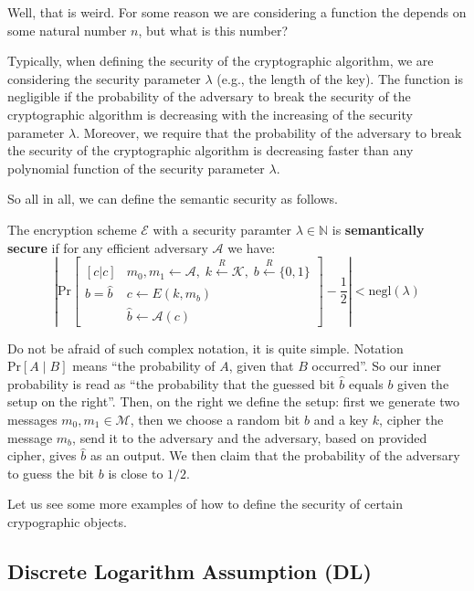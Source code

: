 \documentclass[../lecture-notes.tex]{subfiles}
\begin{document}
Well, that is weird. For some reason we are considering a function the depends on some natural number $n$, but what is this number?

Typically, when defining the security of the cryptographic algorithm, we are considering the security parameter $\lambda$ (e.g., the length of the key). The function is negligible if the probability of the adversary to break the security of the cryptographic algorithm is decreasing with the increasing of the security parameter $\lambda$. Moreover, we require that the probability of the adversary to break the security of the cryptographic algorithm is decreasing faster than any polynomial function of the security parameter $\lambda$.

So all in all, we can define the semantic security as follows.

\begin{definition}
    The encryption scheme $\mathcal{E}$ with a security paramter $\lambda \in \mathbb{N}$ is \textbf{semantically secure} if for any efficient adversary $\mathcal{A}$ we have:
    \begin{equation}
        \left|\text{Pr}\begin{bmatrix}[c|c]
            & m_0, m_1 \gets \mathcal{A}, \; k \xleftarrow{R} \mathcal{K}, \; b \xleftarrow{R} \{0,1\} \\
            b = \hat{b} & c \gets E(k,m_b) \\
            &\hat{b} \gets \mathcal{A}(c)
        \end{bmatrix} - \frac{1}{2}\right| < \text{negl}(\lambda)
    \end{equation}
\end{definition}

Do not be afraid of such complex notation, it is quite simple. Notation $\text{Pr}[A \mid B]$ means ``the probability of $A$, given that $B$ occurred''. So our inner probability is read as ``the probability that the guessed bit $\hat{b}$ equals $b$ given the setup on the right''. Then, on the right we define the setup: first we generate two messages $m_0,m_1 \in \mathcal{M}$, then we choose a random bit $b$ and a key $k$, cipher the message $m_b$, send it to the adversary and the adversary, based on provided cipher, gives $\hat{b}$ as an output. We then claim that the probability of the adversary to guess the bit $b$ is close to $1/2$.

Let us see some more examples of how to define the security of certain crypographic objects.

\subsection{Discrete Logarithm Assumption (DL)}
\end{document}
